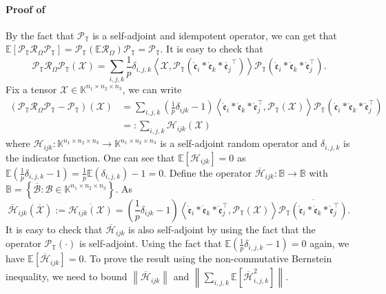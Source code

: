 \documentclass[twoside,12pt]{article}
\def\dme{{\dot{\mathfrak{e}}}}
\def\mrme{{\mathring{\mathfrak{e}}}}
\begin{document}
\paragraph{Proof of }
By the fact that  $\mathcal{P}_{\mathbb{T}}$ is a self-adjoint and idempotent operator, we can get that
$\mathbb{E}[\mathcal{P}_{\mathbb{T}}\mathcal{R}_{\Omega}\mathcal{P}_{\mathbb{T}}] = \mathcal{P}_{\mathbb{T}}(\mathbb{E}\mathcal{R}_{\Omega})\mathcal{P}_{\mathbb{T}} = \mathcal{P}_{\mathbb{T}}$.  
It is easy to check that 
\[\mathcal{P}_{\mathbb{T}} \mathcal{R}_{\Omega} \mathcal{P}_{\mathbb{T}}(\mathcal{X})
=  \sum_{i,j,k}\frac{1}{p}\delta_{i,j,k} \left\langle\mathcal{X}, \mathcal{P}_{\mathbb{T}}\left(\mrme_i * \dme_k * \mathring{\mathfrak{e}_j}^{\top}\right)\right\rangle\mathcal{P}_{\mathbb{T}}\left(\mrme_i * \dme_k * \mrme_j^{\top}\right).\]
Fix a tensor $\mathcal{X}\in \mathbb{K}^{n_1\times n_2\times n_3}$, we can write
\begin{align*}
 \left(\mathcal{P}_{\mathbb{T}} \mathcal{R}_{\Omega} \mathcal{P}_{\mathbb{T}}-\mathcal{P}_{\mathbb{T}}\right)(\mathcal{X}) 
&= \sum\limits_{i,j,k}\left( \frac{1}{p}\delta_{i j k}-1\right)\left\langle\mrme_i * \dme_k * \mrme_j^{\top}, \mathcal{P}_{\mathbb{T}}(\mathcal{X})\right\rangle \mathcal{P}_{\mathbb{T}}\left(\mrme_i * \dme_k * \mrme_j^{\top}\right)\\
&=:  \sum\limits_{i,j,k} \mathcal{H}_{i j k}(\mathcal{X})
\end{align*}
where $\mathcal{H}_{i j k}: \mathbb{K}^{n_1 \times n_2 \times n_3} \rightarrow \mathbb{K}^{n_1 \times n_2 \times n_3}$ is a self-adjoint random operator and $\delta_{i,j,k}$ is the indicator function. One can see that $\mathbb{E}\left[\mathcal{H}_{i j k}\right] = 0$ as $\mathbb{E}(\frac{1}{p}\delta_{i,j,k}-1) = \frac{1}{p}\mathbb{E}(\delta_{i,j,k})-1 = 0$.
Define the operator $\overline{\mathcal{H}}_{i j k}: \mathbb{B} \rightarrow \mathbb{B}$ with $\mathbb{B}=\left\{\overline{\mathcal{B}}: \mathcal{B} \in \mathbb{K}^{n_1 \times n_2 \times n_3}\right\}$. As %
\[
\overline{\mathcal{H}}_{i j k}(\mathcal{\overline{X}}):=\overline{\mathcal{H}_{i j k}(\mathcal{X})}= (\frac{1}{p}\delta_{i j k}-1)\left\langle\mrme_i * \dme_k * \mrme_j^{\top}, \mathcal{P}_{\mathbb{T}}(\mathcal{X})\right\rangle \overline{\mathcal{P}_{\mathbb{T}}\left(\mrme_i * \dme_k * \mrme_j^{\top}\right)}.\]
It is easy to check that $\overline{\mathcal{H}}_{i j k}$ is also self-adjoint by using the fact that the operator $\mathcal{P}_{\mathbb{T}}(\cdot)$ is self-adjoint. Using the fact that $\mathbb{E}(\frac{1}{p}\delta_{i,j,k}-1) = 0$ again, we have $\mathbb{E}\left[\overline{\mathcal{H}}_{i j k}\right]=0$. To prove the result using the non-commutative Bernstein inequality, we need to bound $\left\|\overline{\mathcal{H}}_{i j k}\right\|$ and $\left\|\sum\limits_{i,j,k} \mathbb{E}\left[\overline{\mathcal{H}}_{i,j,k}^2\right]\right\|$.
\end{document}
